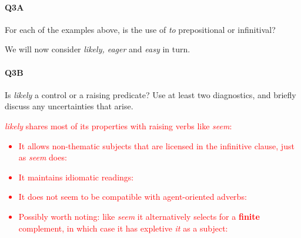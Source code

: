 \documentclass{article}
\begin{document}
\paragraph{Q3A} For each of the examples above, is the use of \emph{to} prepositional or infinitival?
\textcolor{red}{
\begin{exe}
\end{exe}
}

We will now consider \emph{likely, eager} and \emph{easy} in turn.

\paragraph{Q3B} Is \emph{likely} a control or a raising predicate? Use at least two diagnostics, and briefly discuss any uncertainties that arise.

\textcolor{red}{\emph{likely} shares most of its properties with raising verbs like \emph{seem}: 
\begin{itemize}
\item It allows non-thematic subjects that are licensed in the infinitive clause, just as \emph{seem} does:
    \begin{exe}
    \end{exe}
\item It maintains idiomatic readings:
    \begin{exe}
    \end{exe}
\item It does not seem to be compatible with agent-oriented adverbs:
    \begin{exe}
    \end{exe}
\item Possibly worth noting: like \emph{seem} it alternatively selects for a \textbf{finite} complement, in which case it has expletive \emph{it} as a subject:
\begin{exe}
\end{exe}
\end{itemize}
}
\end{document}
